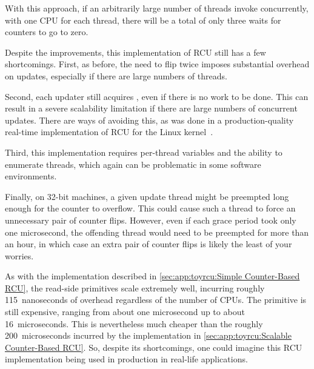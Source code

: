 With this approach, if an arbitrarily large number of threads invoke
 concurrently, with one CPU for each thread, there
will be a total of only three waits for counters to go to zero.

Despite the improvements, this implementation of RCU still
has a few shortcomings.
First, as before, the need to flip  twice imposes substantial
overhead on updates, especially if there are large
numbers of threads.

Second, each updater still acquires , even if there
is no work to be done.
This can result in a severe scalability limitation
if there are large numbers of concurrent updates.
There are ways of avoiding this, as was done in a
production-quality real-time implementation of RCU for the Linux
kernel~\cite{PaulEMcKenney2007PreemptibleRCU}.

Third, this implementation requires per-thread variables
and the ability to enumerate threads, which again can be
problematic in some software environments.

Finally, on 32-bit machines, a given update thread might be
preempted long enough for the 
counter to overflow.
This could cause such a thread to force an unnecessary
pair of counter flips.
However, even if each grace period took only one
microsecond, the offending thread would need to be
preempted for more than an hour, in which case an
extra pair of counter flips is likely the least of
your worries.

As with the implementation described in
\cref{sec:app:toyrcu:Simple Counter-Based RCU},
the read-side primitives scale extremely well, incurring roughly
115~nanoseconds of overhead regardless of the number of CPUs.
The  primitive is still expensive,
ranging from about one microsecond up to about 16~microseconds.
This is nevertheless much cheaper than the roughly 200~microseconds
incurred by the implementation in
\cref{sec:app:toyrcu:Scalable Counter-Based RCU}.
So, despite its shortcomings, one could imagine this
RCU implementation being used in production in real-life applications.

\QuickQuizEnd

